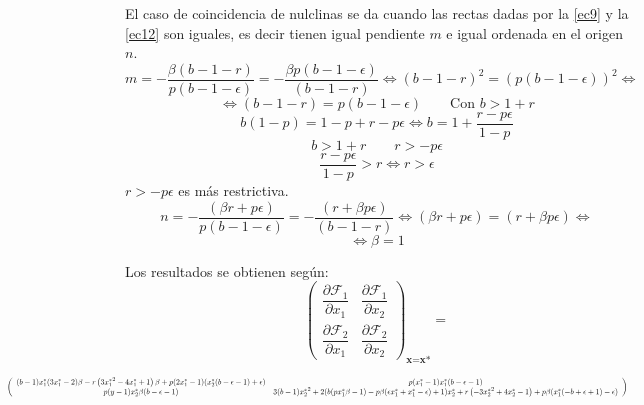 \documentclass[11pt]{article}
\begin{document}
\newpage

\noindent El caso de coincidencia de nulclinas se da cuando las rectas dadas por la \autoref{ec9} y la \autoref{ec12} son iguales, es decir tienen igual pendiente $m$ e igual ordenada en el origen $n$.
\begin{equation*}
m=-\dfrac{\beta(b-1-r)}{p(b-1-\epsilon)}=-\dfrac{\beta p(b-1-\epsilon)}{(b-1-r)}\Longleftrightarrow (b-1-r)^2=(p(b-1-\epsilon))^2 \Longleftrightarrow
\end{equation*}
\begin{equation*}
\Longleftrightarrow (b-1-r)=p(b-1-\epsilon) \qquad \text{Con $b>1+r$}
\end{equation*}
\begin{equation*}
b(1-p)=1-p+r-p\epsilon \Longleftrightarrow b=1+\dfrac{r-p\epsilon}{1-p}
\end{equation*}
\begin{equation*}
b>1+r\qquad r>-p\epsilon
\end{equation*}
\begin{equation*}
\dfrac{r-p\epsilon}{1-p}>r\Longleftrightarrow r>\epsilon
\end{equation*}
$r>-p\epsilon$ es más restrictiva.\\

\begin{equation*}
n=-\dfrac{(\beta r+p\epsilon)}{p(b-1-\epsilon)}=-\dfrac{(r+\beta p\epsilon)}{(b-1-r)}\Longleftrightarrow (\beta r+p\epsilon)=(r+\beta p\epsilon) \Longleftrightarrow 
\end{equation*}
\begin{equation*}
\Longleftrightarrow \beta =1
\end{equation*}

\newpage

Los resultados se obtienen según:
\begin{equation*}
\begin{pmatrix}
\dfrac{\partial \mathcal{F}_1}{\partial x_1} & \dfrac{\partial \mathcal{F}_1}{\partial x_2}\\
\dfrac{\partial \mathcal{F}_2}{\partial x_1} & \dfrac{\partial \mathcal{F}_2}{\partial x_2}
\end{pmatrix}_{\textbf{x}=\textbf{x*}}=
\end{equation*}

\begin{equation*}
\hspace{-3.2cm}
\resizebox{1.35\hsize}{!}{
$\left(
\begin{array}{cc}
 (b-1) x_1^* (3 x_1^*-2) \beta -r \left(3 {x_1^*}^2-4 x_1^*+1\right) \beta +p (2 x_1^*-1) (x_2^* (b-\epsilon -1)+\epsilon ) & p (x_1^*-1) x_1^* (b-\epsilon -1) \\
 p (y-1) x_2^* \beta  (b-\epsilon -1) & 3 (b-1) {x_2^*}^2+2 (b (p x_1^* \beta -1)-p \beta  (\epsilon  x_1^*+x_1^*-\epsilon )+1) x_2^*+r \left(-3 {x_2^*}^2+4 x_2^*-1\right)+p \beta  (x_1^* (-b+\epsilon +1)-\epsilon ) \\
\end{array}
\right)$}
\end{equation*}\\
\end{document}
